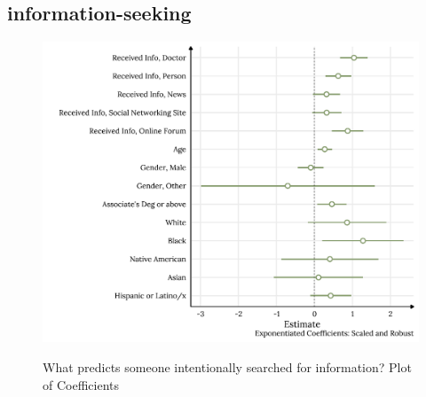 \hypertarget{information-seeking}{%
\subsection{information-seeking}\label{information-seeking}}



\begin{figure}[h]
{\centering \includegraphics[width=0.8\linewidth]{figs/paper2/plot-model-1-1}}
\caption{What predicts someone intentionally searched for information? Plot of Coefficients}\label{fig:plot-model-1}
\end{figure}

